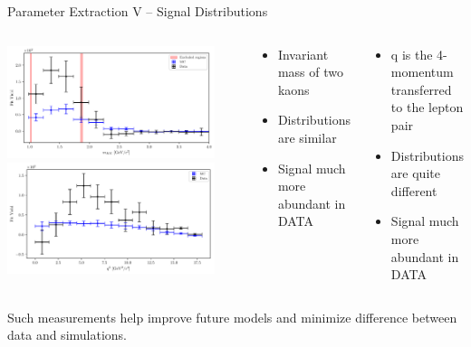 \documentclass[serif]{beamer}
\begin{document}
\begin{frame}[t]{Parameter Extraction V -- Signal Distributions}
\vspace{-3mm}
\small

\begin{columns}
	\begin{center}
		\includegraphics[width=0.9\textwidth]{fig/sig_mKK_all}\\
		\includegraphics[width=0.9\textwidth]{fig/sig_q2_all}
	\end{center}
	\begin{block}{}
		\begin{itemize}
			\item Invariant mass of two kaons
			\item Distributions are similar
			\item Signal much more abundant in DATA
		\end{itemize}
	\end{block}
\begin{block}{}
	\begin{itemize}
		\item $\mathrm{q}$ is the 4-momentum transferred to the lepton pair
		\item Distributions are quite different
		\item Signal much more abundant in DATA
	\end{itemize}
\end{block}
\end{columns}

Such measurements help improve future models and minimize difference between data and simulations. 

\end{frame}
\end{document}
